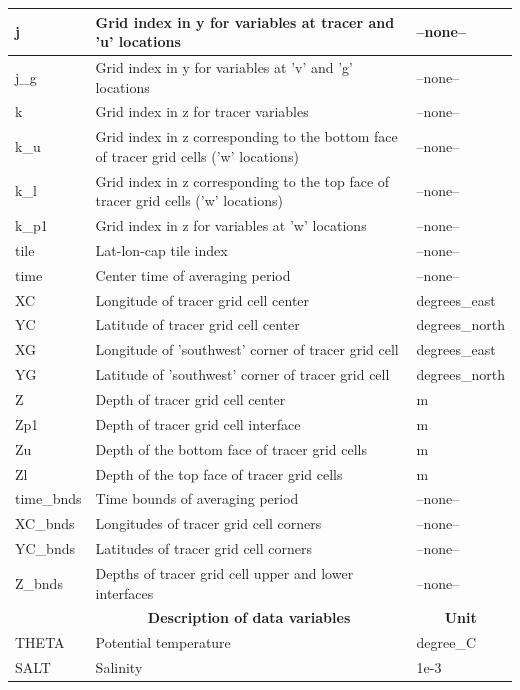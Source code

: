 \begin{longtable}{|m{}|m{}|m{}|}
j &Grid index in y for variables at tracer and 'u' locations &--none--  \\ \hline
j\_g &Grid index in y for variables at 'v' and 'g' locations &--none--  \\ \hline
k &Grid index in z for tracer variables &--none--  \\ \hline
k\_u &Grid index in z corresponding to the bottom face of tracer grid cells ('w' locations) &--none--  \\ \hline
k\_l &Grid index in z corresponding to the top face of tracer grid cells ('w' locations) &--none--  \\ \hline
k\_p1 &Grid index in z for variables at 'w' locations &--none--  \\ \hline
tile &Lat-lon-cap tile index &--none--  \\ \hline
time &Center time of averaging period &--none--  \\ \hline
XC &Longitude of tracer grid cell center &degrees\_east  \\ \hline
YC &Latitude of tracer grid cell center &degrees\_north  \\ \hline
XG &Longitude of 'southwest' corner of tracer grid cell &degrees\_east  \\ \hline
YG &Latitude of 'southwest' corner of tracer grid cell &degrees\_north  \\ \hline
Z &Depth of tracer grid cell center &m  \\ \hline
Zp1 &Depth of tracer grid cell interface &m  \\ \hline
Zu &Depth of the bottom face of tracer grid cells &m  \\ \hline
Zl &Depth of the top face of tracer grid cells &m  \\ \hline
time\_bnds &Time bounds of averaging period &--none--  \\ \hline
XC\_bnds &Longitudes of tracer grid cell corners &--none--  \\ \hline
YC\_bnds &Latitudes of tracer grid cell corners &--none--  \\ \hline
Z\_bnds &Depths of tracer grid cell upper and lower interfaces &--none--  \\ \hline
\rowcolor{lightgray} \multicolumn{1}{|c|}{\textbf{Variables}} & \multicolumn{1}{|c|}{\textbf{Description of data variables}} & \multicolumn{1}{|c|}{\textbf{Unit}}\\ \hline
THETA &Potential temperature  &degree\_C  \\ \hline
SALT &Salinity &1e-3  \\ \hline
\end{longtable}

